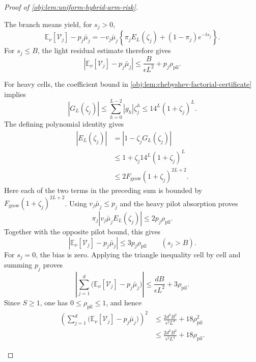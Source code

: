 \begin{proof}[Proof of \cref{obj:lem:uniform-hybrid-arm-risk}]
\begin{enumerate}
The branch means yield, for \(s_j>0\),
\[
\mathbb E_\nu[\mathcal V_j]-p_j\bar\mu_j
=
-v_j\bar\mu_j
\left\{\pi_jE_L(\zeta_j)+(1-\pi_j)e^{-ts_j}\right\}.
\]
For \(s_j\le B\), the light residual estimate therefore gives
\[
\left|\mathbb E_\nu[\mathcal V_j]-p_j\bar\mu_j\right|
\le\frac B{\epsilon L^2}+p_j\rho_{\mathrm{pil}}.
\]

For heavy cells, the coefficient bound in
\cref{obj:lem:chebyshev-factorial-certificate} implies
\[
|G_L(\zeta_j)|
\le
\sum_{h=0}^{L-2}|g_h|\zeta_j^h
\le14^L(1+\zeta_j)^L.
\]
The defining polynomial identity gives
\[
\begin{aligned}
|E_L(\zeta_j)|
&=|1-\zeta_jG_L(\zeta_j)|\\
&\le1+\zeta_j14^L(1+\zeta_j)^L\\
&\le2F_{\mathrm{grow}}(1+\zeta_j)^{2L+2}.
\end{aligned}
\]
Here each of the two terms in the preceding sum is bounded by
\(F_{\mathrm{grow}}(1+\zeta_j)^{2L+2}\).
Using \(v_j\bar\mu_j\le p_j\) and the heavy pilot absorption proves
\[
\pi_j|v_j\bar\mu_jE_L(\zeta_j)|
\le2p_j\rho_{\mathrm{pil}}.
\]
Together with the opposite pilot bound, this gives
\[
\left|\mathbb E_\nu[\mathcal V_j]-p_j\bar\mu_j\right|
\le3p_j\rho_{\mathrm{pil}}
\qquad(s_j>B).
\]
For \(s_j=0\), the bias is zero. Applying the triangle inequality cell by cell and summing \(p_j\) proves
\[
\left|
\sum_{j=1}^d
\bigl(\mathbb E_\nu[\mathcal V_j]-p_j\bar\mu_j\bigr)
\right|
\le\frac{dB}{\epsilon L^2}+3\rho_{\mathrm{pil}}.
\]
Since \(S\ge1\), one has \(0\le\rho_{\mathrm{pil}}\le1\), and hence
\[
\begin{aligned}
\left(
\sum_{j=1}^d
\bigl(\mathbb E_\nu[\mathcal V_j]-p_j\bar\mu_j\bigr)
\right)^2
&\le
\frac{2d^2B^2}{\epsilon^2L^4}
+18\rho_{\mathrm{pil}}^2\\
&\le
\frac{2d^2B^2}{\epsilon^2L^4}
+18\rho_{\mathrm{pil}}.
\end{aligned}
\]


\end{enumerate}
\end{proof}

